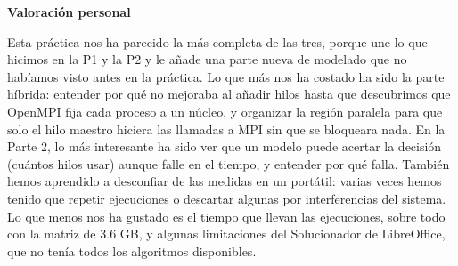 \documentclass[12pt]{article}
\begin{document}
\begin{enumerate}
\medskip
\noindent\textbf{Valoración personal}\par
\smallskip


Esta práctica nos ha parecido la más completa de las tres, porque une lo que hicimos en la P1 y la P2 y le añade una parte nueva de modelado que no habíamos visto antes en la práctica. Lo que más nos ha costado ha sido la parte híbrida: entender por qué no mejoraba al añadir hilos hasta que descubrimos que OpenMPI fija cada proceso a un núcleo, y organizar la región paralela para que solo el hilo maestro hiciera las llamadas a MPI sin que se bloqueara nada. En la Parte 2, lo más interesante ha sido ver que un modelo puede acertar la decisión (cuántos hilos usar) aunque falle en el tiempo, y entender por qué falla. También hemos aprendido a desconfiar de las medidas en un portátil: varias veces hemos tenido que repetir ejecuciones o descartar algunas por interferencias del sistema. Lo que menos nos ha gustado es el tiempo que llevan las ejecuciones, sobre todo con la matriz de 3.6 GB, y algunas limitaciones del Solucionador de LibreOffice, que no tenía todos los algoritmos disponibles.

\end{enumerate}
\end{document}
